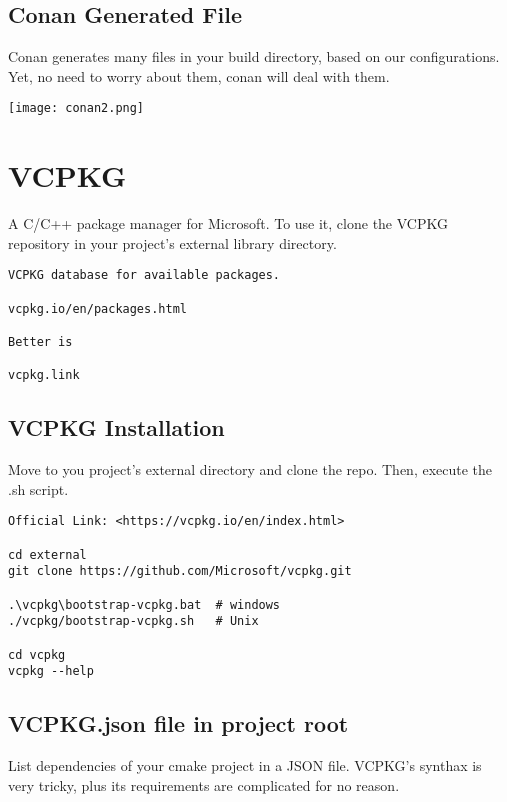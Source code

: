 \documentclass[openany]{report}
\begin{document}
\subsection{Conan Generated File}

Conan generates many files in your build directory, based on our configurations. Yet, no need to worry about them, conan
will deal with them.


\begin{center}
    \texttt{[image: conan2.png]}
\end{center}

\section{VCPKG}

A C/C++ package manager for Microsoft. 
To use it, clone the VCPKG repository in your project's external library directory.

\begin{verbatim}
VCPKG database for available packages.

vcpkg.io/en/packages.html

Better is 

vcpkg.link 
\end{verbatim}

\subsection{VCPKG Installation}

Move to you project's external directory and clone the repo. Then, execute the .sh script.
 
\begin{verbatim}
Official Link: <https://vcpkg.io/en/index.html>

cd external
git clone https://github.com/Microsoft/vcpkg.git

.\vcpkg\bootstrap-vcpkg.bat  # windows
./vcpkg/bootstrap-vcpkg.sh   # Unix

cd vcpkg 
vcpkg --help 
\end{verbatim}


\subsection{VCPKG.json file in project root}

List dependencies of your cmake project in a JSON file. VCPKG's synthax is very tricky, plus its 
requirements are complicated for no reason.
\end{document}
